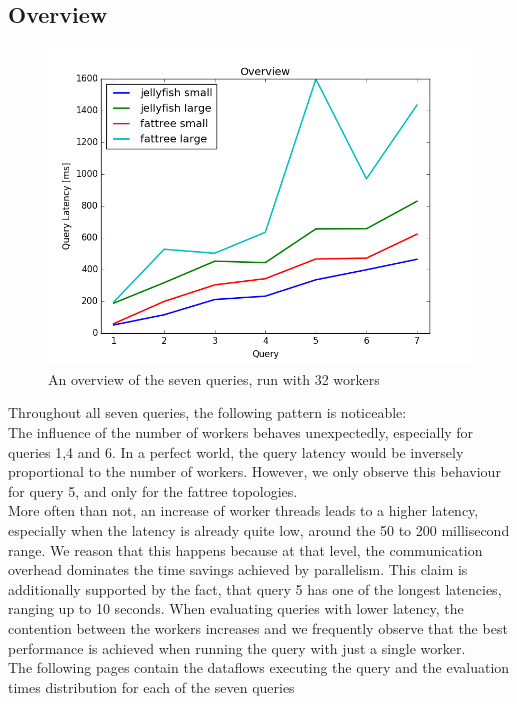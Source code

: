 \documentclass[11pt,singlecolumn]{scrartcl}
\begin{document}
\subsection{Overview}
\begin{figure}[H]
\includegraphics[width=1\textwidth]{ov}
\caption{An overview of the seven queries, run with 32 workers}
\end{figure}
Throughout all seven queries, the following pattern is noticeable:\\
The influence of the number of workers behaves unexpectedly, especially for queries 1,4 and 6. In a perfect world, the query latency would be inversely proportional to the number of workers. However, we only observe this behaviour for query 5, and only for the fattree topologies.\\More often than not, an increase of worker threads leads to a higher latency, especially when the latency is already quite low, around the 50 to 200 millisecond range. We reason that this happens because at that level, the communication overhead dominates the time savings achieved by parallelism. This claim is additionally supported by the fact, that query 5 has one of the longest latencies, ranging up to 10 seconds. When evaluating queries with lower latency, the contention between the workers increases and we frequently observe that the best performance is achieved when running the query with just a single worker.\\
The following pages contain the dataflows executing the query and the evaluation times distribution for each of the seven queries

\clearpage
\end{document}
